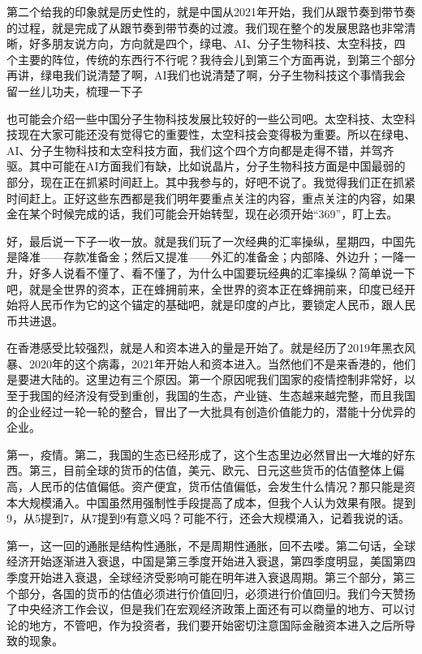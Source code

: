 \documentclass[UTF8, 12pt, a4paper]{ctexrep}
\begin{document}
第二个给我的印象就是历史性的，就是中国从2021年开始，我们从跟节奏到带节奏的过程，就是完成了从跟节奏到带节奏的过渡。我们现在整个的发展思路也非常清晰，好多朋友说方向，方向就是四个，绿电、AI、分子生物科技、太空科技，四个主要的阵位，传统的东西行不行呢？我待会儿到第三个方面再说，到第三个部分再讲，绿电我们说清楚了啊，AI我们也说清楚了啊，分子生物科技这个事情我会留一丝儿功夫，梳理一下子

也可能会介绍一些中国分子生物科技发展比较好的一些公司吧。太空科技、太空科技现在大家可能还没有觉得它的重要性，太空科技会变得极为重要。所以在绿电、AI、分子生物科技和太空科技方面，我们这个四个方向都是走得不错，并驾齐驱。其中可能在AI方面我们有缺，比如说晶片，分子生物科技方面是中国最弱的部分，现在正在抓紧时间赶上。其中我参与的，好吧不说了。我觉得我们正在抓紧时间赶上。正好这些东西都是我们明年要重点关注的内容，重点关注的内容，如果金在某个时候完成的话，我们可能会开始转型，现在必须开始“369”，盯上去。

好，最后说一下子一收一放。就是我们玩了一次经典的汇率操纵，星期四，中国先是降准——存款准备金；然后又提准——外汇的准备金；内部降、外边升；一降一升，好多人说看不懂了、看不懂了，为什么中国要玩经典的汇率操纵？简单说一下吧，就是全世界的资本，正在蜂拥前来，全世界的资本正在蜂拥前来，印度已经开始将人民币作为它的这个锚定的基础吧，就是印度的卢比，要锁定人民币，跟人民币共进退。

在香港感受比较强烈，就是人和资本进入的量是开始了。就是经历了2019年黑衣风暴、2020年的这个病毒，2021年开始人和资本进入。当然他们不是来香港的，他们是要进大陆的。这里边有三个原因。第一个原因呢我们国家的疫情控制非常好，以至于我国的经济没有受到重创，我国的生态，产业链、生态越来越完整，而且我国的企业经过一轮一轮的整合，冒出了一大批具有创造价值能力的，潜能十分优异的企业。

第一，疫情。第二，我国的生态已经形成了，这个生态里边必然冒出一大堆的好东西。第三，目前全球的货币的估值，美元、欧元、日元这些货币的估值整体上偏高，人民币的估值偏低。资产便宜，货币估值偏低，会发生什么情况？那只能是资本大规模涌入。中国虽然用强制性手段提高了成本，但我个人认为效果有限。提到9，从5提到7，从7提到9有意义吗？可能不行，还会大规模涌入，记着我说的话。

第一，这一回的通胀是结构性通胀，不是周期性通胀，回不去喽。第二句话，全球经济开始逐渐进入衰退，中国是第三季度开始进入衰退，第四季度明显，美国第四季度开始进入衰退，全球经济受影响可能在明年进入衰退周期。第三个部分，第三个部分，各国的货币的估值必须进行价值回归，必须进行价值回归。我们今天赞扬了中央经济工作会议，但是我们在宏观经济政策上面还有可以商量的地方、可以讨论的地方，不管吧，作为投资者，我们要开始密切注意国际金融资本进入之后所导致的现象。
\end{document}
